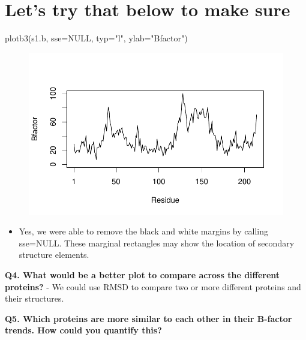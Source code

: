 \documentclass[
  letterpaper,
  DIV=11,
  numbers=noendperiod]{scrartcl}
\newenvironment{Shaded}{\begin{snugshade}}{\end{snugshade}}
\newcommand{\AttributeTok}[1]{\textcolor[rgb]{0.40,0.45,0.13}{#1}}
\newcommand{\ConstantTok}[1]{\textcolor[rgb]{0.56,0.35,0.01}{#1}}
\newcommand{\FunctionTok}[1]{\textcolor[rgb]{0.28,0.35,0.67}{#1}}
\newcommand{\NormalTok}[1]{\textcolor[rgb]{0.00,0.23,0.31}{#1}}
\newcommand{\StringTok}[1]{\textcolor[rgb]{0.13,0.47,0.30}{#1}}
\providecommand{\tightlist}{%
  \setlength{\itemsep}{0pt}\setlength{\parskip}{0pt}}\usepackage{longtable,booktabs,array}
\begin{document}
\hypertarget{lets-try-that-below-to-make-sure}{%
\section{Let's try that below to make
sure}\label{lets-try-that-below-to-make-sure}}

\begin{Shaded}
\begin{Highlighting}[]
\FunctionTok{plotb3}\NormalTok{(s1.b, }\AttributeTok{sse=}\ConstantTok{NULL}\NormalTok{, }\AttributeTok{typ=}\StringTok{"l"}\NormalTok{, }\AttributeTok{ylab=}\StringTok{"Bfactor"}\NormalTok{)}
\end{Highlighting}
\end{Shaded}

\begin{figure}[H]

{\centering \includegraphics{hw6_turnin_files/figure-pdf/unnamed-chunk-3-1.pdf}

}

\end{figure}

\begin{itemize}
\tightlist
\item
  Yes, we were able to remove the black and white margins by calling
  sse=NULL. These marginal rectangles may show the location of secondary
  structure elements.
\end{itemize}

\textbf{Q4. What would be a better plot to compare across the different
proteins?} - We could use RMSD to compare two or more different proteins
and their structures.

\textbf{Q5. Which proteins are more similar to each other in their
B-factor trends. How could you quantify this?}
\end{document}
